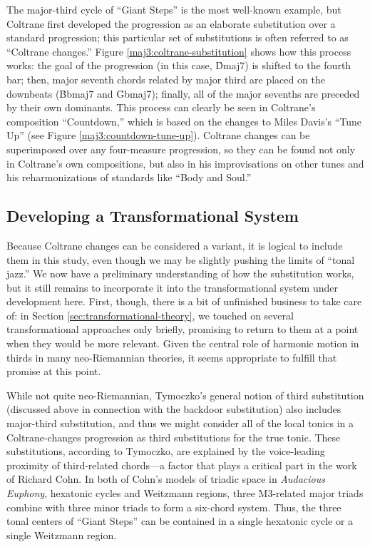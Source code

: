 The major-third cycle of ``Giant Steps'' is the most well-known example, but
Coltrane first developed the progression as an elaborate substitution over a
standard \tfo progression; this particular set of substitutions is often
referred to as ``Coltrane changes.'' Figure
\ref{maj3:coltrane-substitution} shows how this process works: the goal of the
progression (in this case, \h{Dmaj7}) is shifted to the fourth bar; then, major
seventh chords related by major third are placed on the downbeats (\h{Bbmaj7}
and \h{Gbmaj7}); finally, all of the major sevenths are preceded by their own
dominants.\nocite{levine:1995} This process can clearly be seen in Coltrane's
composition ``Countdown,'' which is based on the changes to Miles Davis's
``Tune Up'' (see Figure \ref{maj3:countdown-tune-up}).
Coltrane changes can be superimposed over any four-measure \tfo progression,
so they can be found not only in Coltrane's own compositions, but also in his
improvisations on other tunes and his reharmonizations of standards
like ``Body and Soul.''

\subsection{Developing a Transformational System}
\label{subsec:maj3-transformations}

Because Coltrane changes can be considered a \tf variant, it is logical to
include them in this study, even though we may be slightly pushing the limits
of ``tonal jazz.'' We now have a preliminary understanding of how the substitution
works, but it still remains to incorporate it into the transformational system
under development here. First, though, there is a bit of unfinished business
to take care of: in Section \ref{sec:transformational-theory}, we touched on
several transformational approaches only briefly, promising to return to them
at a point when they would be more relevant. Given the central role of
harmonic motion in thirds in many neo-Riemannian theories, it seems
appropriate to fulfill that promise at this point.

While not quite neo-Riemannian, Tymoczko's general notion of third
substitution (discussed above in connection with the backdoor substitution)
also includes major-third substitution, and thus we might consider all of the
local tonics in a Coltrane-changes progression as third substitutions for the
true tonic. These substitutions, according to Tymoczko, are explained by the
voice-leading proximity of third-related chords---a factor that plays a
critical part in the work of Richard Cohn. In both of Cohn's models of triadic
space in \emph{Audacious Euphony}, hexatonic cycles and Weitzmann
regions, three M3-related major triads combine with three minor triads to
form a six-chord system. Thus, the three tonal centers of ``Giant
Steps'' can be contained in a single hexatonic cycle or a single Weitzmann
region.

